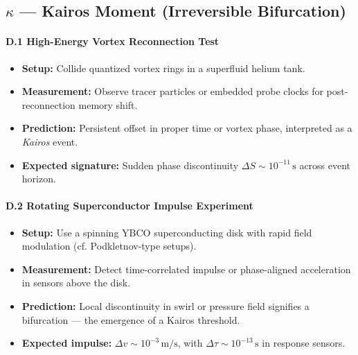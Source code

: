 \subsection*{\(\kappa\) --- Kairos Moment (Irreversible Bifurcation)}

\paragraph{D.1 High-Energy Vortex Reconnection Test}
\begin{itemize}
    \item \textbf{Setup:} Collide quantized vortex rings in a superfluid helium tank.
    \item \textbf{Measurement:} Observe tracer particles or embedded probe clocks for post-reconnection memory shift.
    \item \textbf{Prediction:} Persistent offset in proper time or vortex phase, interpreted as a \emph{Kairos} event.
    \item \textbf{Expected signature:} Sudden phase discontinuity \( \Delta S \sim 10^{-11} \, \mathrm{s} \) across event horizon.
\end{itemize}

\paragraph{D.2 Rotating Superconductor Impulse Experiment}
\begin{itemize}
    \item \textbf{Setup:} Use a spinning YBCO superconducting disk with rapid field modulation (cf. Podkletnov-type setups).
    \item \textbf{Measurement:} Detect time-correlated impulse or phase-aligned acceleration in sensors above the disk.
    \item \textbf{Prediction:} Local discontinuity in swirl or pressure field signifies a bifurcation --- the emergence of a Kairos threshold.
    \item \textbf{Expected impulse:} \( \Delta v \sim 10^{-3} \, \mathrm{m/s} \), with \( \Delta \tau \sim 10^{-13} \, \mathrm{s} \) in response sensors.
\end{itemize}
